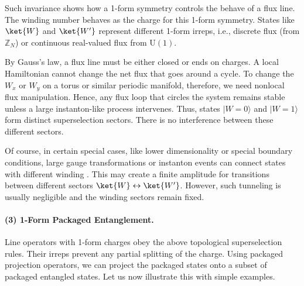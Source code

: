 \documentclass[12pt,a4paper]{article}
\begin{document}
Such invariance shows how a 1-form symmetry controls the behave of a flux line.
The winding number behaves as the charge for this 1-form symmetry.
States like $\ket{W}$ and $\ket{W'}$ represent different 1-form irreps, i.e., discrete flux (from $\mathbb{Z}_N$) or continuous real-valued flux from $\mathrm{U}(1)$.


By Gauss's law, a flux line must be either closed or ends on charges.
A local Hamiltonian cannot change the net flux that goes around a cycle.
To change the $W_x$ or $W_y$ on a torus or similar periodic manifold, therefore, we need nonlocal flux manipulation.
Hence, any flux loop that circles the system remains stable unless a large instanton-like process intervenes.\cite{Polyakov1975,Luscher1980}
Thus, states $\lvert W=0\rangle$ and $\lvert W=1\rangle$ form distinct superselection sectors.
There is no interference between these different sectors.


Of course, in certain special cases, like lower dimensionality or special boundary conditions, large gauge transformations or instanton events can connect states with different winding \cite{Belavin1975}.
This may create a finite amplitude for transitions between different sectors $\ket{W} \leftrightarrow \ket{W'}$.
However, such tunneling is usually negligible and the winding sectors remain fixed.


\paragraph{(3) 1-Form Packaged Entanglement.}
Line operators with 1-form charges obey the above topological superselection rules.
Their irreps prevent any partial splitting of the charge.
Using packaged projection operators, we can project the packaged states onto a subset of packaged entangled states.
Let us now illustrate this with simple examples.
\end{document}
